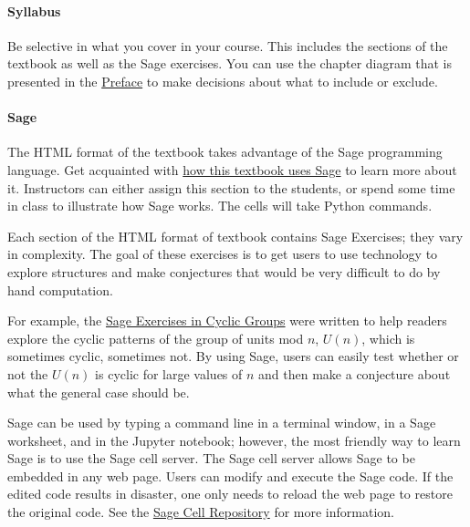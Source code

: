 \documentclass[10pt,]{article}
\begin{document}
\paragraph[{Syllabus}]{Syllabus}\hypertarget{paragraphs-4}{}
\hypertarget{p-15}{}%
Be selective in what you cover in your course. This includes the sections of the textbook as well as the Sage exercises. You can use the chapter diagram that is presented in the \href{https://books.aimath.org/aata/preface-1.html}{Preface} to make decisions about what to include or exclude.%
\typeout{************************************************}
\typeout{************************************************}
\paragraph[{Sage}]{Sage}\hypertarget{paragraphs-5}{}
\hypertarget{p-16}{}%
The HTML format of the textbook takes advantage of the Sage programming language. Get acquainted with \href{https://books.aimath.org/aata/sets-sage.html}{how this textbook uses Sage} to learn more about it. Instructors can either assign this section to the students, or spend some time in class to illustrate how Sage works. The cells will take Python commands.%
\par
\hypertarget{p-17}{}%
Each section of the HTML format of textbook contains Sage Exercises; they vary in complexity. The goal of these exercises is to get users to use technology to explore structures and make conjectures that would be very difficult to do by hand computation.%
\par
\hypertarget{p-18}{}%
For example, the \href{https://books.aimath.org/aata/cyclic-sage-exercises.html}{Sage Exercises in Cyclic Groups} were written to help readers explore the cyclic patterns of the group of units mod \(n\), \(U(n)\), which is sometimes cyclic, sometimes not. By using Sage, users can easily test whether or not the \(U(n)\) is cyclic for large values of \(n\) and then make a conjecture about what the general case should be.%
\par
\hypertarget{p-19}{}%
Sage can be used by typing a command line in a terminal window, in a Sage worksheet, and in the Jupyter notebook; however, the most friendly way to learn Sage is to use the Sage cell server.  The Sage cell server allows Sage to be embedded in any web page.  Users can modify and execute the Sage code.  If the edited code results in disaster, one only needs to reload the web page to restore the original code.  See the \href{http://utmost-sage-cell.org}{Sage Cell Repository} for more information.%
\typeout{************************************************}
\typeout{************************************************}
\end{document}
